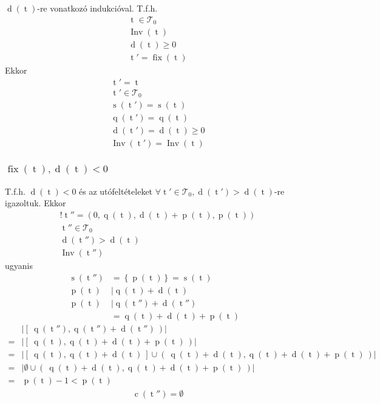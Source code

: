 \documentclass{article}
\newcommand*{\Trees}{\ensuremath{\mathcal{T}}}
\newcommand*{\fFix}{\ensuremath{\operatorname{fix}}}
\newcommand*{\fInv}{\ensuremath{\operatorname{Inv}}}
\newcommand*{\sChildren}[1]{\ensuremath{\operatorname{c}\left(#1\right)}}
\newcommand*{\sDiff}[1]{\ensuremath{\operatorname{d}\left(#1\right)}}
\newcommand*{\sPosition}[1]{\ensuremath{\operatorname{q}\left(#1\right)}}
\newcommand*{\sPrime}[1]{\ensuremath{\operatorname{p}\left(#1\right)}}
\newcommand*{\sPrimes}[1]{\ensuremath{\operatorname{s}\left(#1\right)}}
\newcommand*{\vT}{\ensuremath{\operatorname{t}}}
\begin{document}
$ \sDiff{\vT} $-re vonatkozó indukcióval. T.f.h.
\begin{align*}
\vT \in \Trees_0 \\
\fInv(\vT) \\
\sDiff{\vT} \ge 0 \\
\vT' = \fFix(\vT)
\end{align*}
Ekkor
\begin{align*}
\vT' = \vT \\
\vT' \in \Trees_0 \tag{F1} \\
\sPrimes{\vT'} = \sPrimes{\vT} \tag{F2} \\
\sPosition{\vT'} = \sPosition{\vT} \tag{F3} \\
\sDiff{\vT'} = \sDiff{\vT} \ge 0 \tag{F4} \\
\fInv(\vT') = \fInv(\vT) \tag{F5}
\end{align*}

\subsubsection{$ \fFix(\vT), \sDiff{\vT} < 0 $ }

T.f.h. $ \sDiff{\vT} < 0 $ és az utófeltételeket
$ \forall \vT' \in \Trees_0, \sDiff{\vT'} > \sDiff{\vT} $-re igazoltuk. Ekkor
\begin{align*}
! \vT'' = (0, \sPosition{\vT}, \sDiff{\vT} + \sPrime{\vT}, \sPrime{\vT}) \\
\vT'' \in \Trees_0 \\
\sDiff{\vT''} > \sDiff{\vT} \\
\fInv(\vT'')
\end{align*}
ugyanis
\begin{align*}
\sPrimes{\vT''} & = \left\lbrace \sPrime{\vT} \right\rbrace
	= \sPrimes{\vT} & \\
\sPrime{\vT} & \mid \sPosition{\vT} + \sDiff{\vT} \\
\sPrime{\vT} & \mid \sPosition{\vT''} + \sDiff{\vT''} \\
	& = \sPosition{\vT} + \sDiff{\vT} + \sPrime{\vT} \tag{I1}
\end{align*}
\begin{align*}
& \mathopen| \left[\ \sPosition{\vT''},
	\sPosition{\vT''} + \sDiff{\vT''}\ \right) \mathclose| \\
=& \mathopen| \left[\ \sPosition{\vT},
	\sPosition{\vT} + \sDiff{\vT} +\sPrime{\vT} \ \right) \mathclose| \\
=& \mathopen| \left[\ \sPosition{\vT},
	\sPosition{\vT} + \sDiff{\vT} \ \right]
	\cup \left(\ \sPosition{\vT} + \sDiff{\vT},
	\sPosition{\vT} + \sDiff{\vT} +\sPrime{\vT} \ \right) \mathclose| \\
=& \mathopen| \emptyset \cup \left(\ \sPosition{\vT} + \sDiff{\vT},
	\sPosition{\vT} + \sDiff{\vT} +\sPrime{\vT} \ \right) \mathclose| \\
=& \sPrime{\vT}-1 < \sPrime{\vT} \tag{I2}
\end{align*}
\begin{align*}
\sChildren{\vT''} = \emptyset \tag{I3, I4}
\end{align*}
\end{document}
